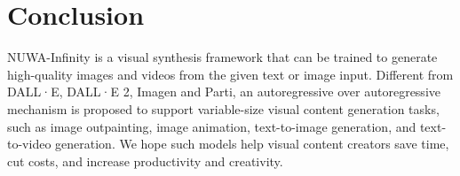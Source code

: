 \documentclass{article}
\begin{document}





\section{Conclusion}
NUWA-Infinity is a visual synthesis framework that can be trained to generate high-quality images and videos from the given text or image input. Different from DALL·E, DALL·E 2, Imagen and Parti, an autoregressive over autoregressive mechanism is proposed to support variable-size visual content generation tasks, such as image outpainting, image animation, text-to-image generation, and text-to-video generation. We hope such models help visual content creators save time, cut costs, and increase productivity and creativity.
\end{document}
